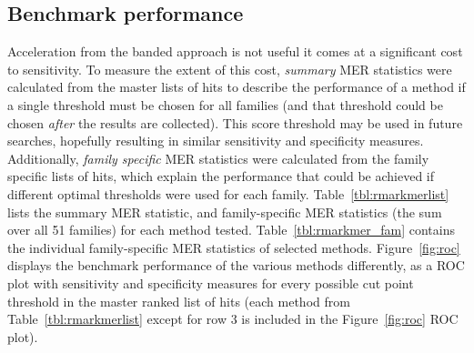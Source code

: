 \documentclass[11pt]{article}
\begin{document}
\subsection{Benchmark performance}
Acceleration from the banded approach is not useful it comes
at a significant cost to sensitivity. 
To measure the extent of this cost, \emph{summary} MER statistics were
calculated from the master lists of hits to 
describe the performance of a method if a single threshold must
be chosen for all families (and that threshold could be chosen
\emph{after} the results are collected). This score threshold may be
used in future searches, hopefully resulting in similar sensitivity and specificity
measures. Additionally, \emph{family specific} MER statistics were
calculated from the family specific lists of hits, which explain
the performance that could be achieved if different optimal thresholds
were used for each family. Table~\ref{tbl:rmarkmerlist} lists the
summary MER statistic, and family-specific MER statistics (the sum
over all 51 families) for each method tested.
Table~\ref{tbl:rmarkmer_fam} contains the
individual family-specific MER statistics of selected methods.
Figure~\ref{fig:roc} displays the benchmark performance
of the various methods differently, as a ROC plot with sensitivity and
specificity measures for every possible cut point threshold in the
master ranked list of hits (each method from 
Table~\ref{tbl:rmarkmerlist} except for row 3 is included in the
Figure~\ref{fig:roc} ROC plot).
\end{document}
